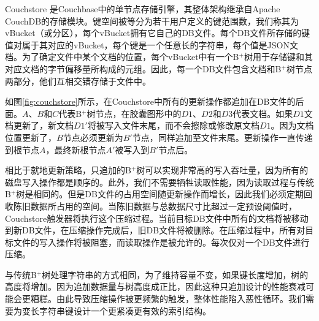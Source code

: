 Couchstore 是Couchbase中的单节点存储引擎，其整体架构继承自Apache CouchDB的存储模块。键空间被等分为若干用户定义的键范围数，我们称其为vBucket（或分区），每个vBucket拥有它自己的DB文件。每个DB文件所存储的键值对属于其对应的vBucket，每个键是一个任意长的字符串，每个值是JSON文档。为了确定文件中某个文档的位置，每个vBucket中有一个B$^+$树用于存储键和其对应文档的字节偏移量所构成的元组。因此，每一个DB文件包含文档和B$^+$树节点两部分，他们互相交错存储于文件中。

如图\ref{fig:couchstore}所示，在Couchstore中所有的更新操作都追加在DB文件的后面。$A$、$B$和$C$代表B$^+$树节点，在胶囊图形中的$D1$、$D2$和$D3$代表文档。如果$D1$文档更新了，新文档$D1'$将被写入文件末尾，而不会擦除或修改原文档$D1$。因为文档位置更新了，$B$节点必须更新为$B'$节点，同样追加至文件末尾。更新操作一直传递到根节点$A$，最终新根节点$A'$被写入到$B'$节点后。

相比于就地更新策略，只追加的B$^+$树可以实现非常高的写入吞吐量，因为所有的磁盘写入操作都是顺序的。此外，我们不需要牺牲读取性能，因为读取过程与传统B$^+$树是相同的。但是DB文件的占用空间随更新操作而增长，因此我们必须定期回收陈旧数据所占用的空间。当陈旧数据与总数据尺寸比超过一定预设阈值时，Couchstore触发器将执行这个压缩过程。当前目标DB文件中所有的文档将被移动到新DB文件，在压缩操作完成后，旧DB文件将被删除。在压缩过程中，所有对目标文件的写入操作将被阻塞，而读取操作是被允许的。每次仅对一个DB文件进行压缩。

与传统B$^+$树处理字符串的方式相同，为了维持容量不变，如果键长度增加，树的高度将增加。因为追加数据量与树高度成正比，因此这种只追加设计的性能衰减可能会更糟糕。由此导致压缩操作被更频繁的触发，整体性能陷入恶性循环。我们需要为变长字符串键设计一个更紧凑更有效的索引结构。